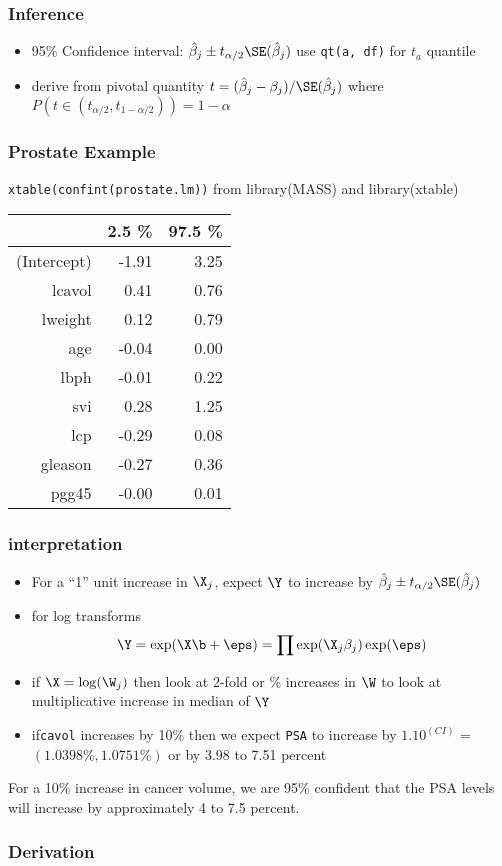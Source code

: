 \documentclass[handout]{beamer}
\begin{document}
\begin{frame}
  \frametitle{Inference}
\vspace{-.5in}

  \begin{itemize}
  \item 
   95\% Confidence interval:  $\hat{\beta}_j \pm t_{\alpha/2}
   \SE(\hat{\beta}_j)$  \pause use {\tt qt(a, df)} for $t_a$ quantile
\item derive from pivotal quantity $t = (\hat{\beta}_j -
  \beta_j)/\SE(\hat{\beta}_j)$ where 
 $P(t \in (t_{\alpha/2}, t_{1 - \alpha/2}))  = 1 -\alpha$
  \end{itemize}

\vfill

\end{frame}
\begin{frame}\frametitle{Prostate Example}
{\tt xtable(confint(prostate.lm))}  from library(MASS) and library(xtable)
  \begin{table}[ht]
\centering
\begin{tabular}{rrr}
  \hline
 & 2.5 \% & 97.5 \% \\ 
  \hline
(Intercept) & -1.91 & 3.25 \\ 
  lcavol & 0.41 & 0.76 \\ 
  lweight & 0.12 & 0.79 \\ 
  age & -0.04 & 0.00 \\ 
  lbph & -0.01 & 0.22 \\ 
  svi & 0.28 & 1.25 \\ 
  lcp & -0.29 & 0.08 \\ 
  gleason & -0.27 & 0.36 \\ 
  pgg45 & -0.00 & 0.01 \\ 
   \hline
\end{tabular}
\end{table}
\end{frame}
\begin{frame} \frametitle{interpretation}
  \begin{itemize}
  \item 
  For a ``1'' unit increase in $\X_j$, expect $\Y$ to increase by $\hat{\beta}_j \pm t_{\alpha/2}
   \SE(\hat{\beta}_j)$ 
\item for log transforms
$$\Y = \exp(\X\b + \eps) = \prod \exp(\X_j \beta_j) \exp(\eps)$$
\item if $\X = \log(\W_j)$ then look at 2-fold or \%
  increases in $\W$ to look at multiplicative increase in median of $\Y$
\item if{\tt  cavol} increases by 10\%  then we expect {\tt PSA} to increase
  by $1.10^{(CI)}$  = $( 1.0398 \%, 1.0751 \%)$ or by 3.98 to 7.51 percent
  \end{itemize}
For a 10\% increase in cancer volume, we are 95\% confident  that the PSA levels
will increase by approximately 4 to 7.5 percent.
\end{frame}
\begin{frame}\frametitle{Derivation}
  
\end{frame}
\end{document}
